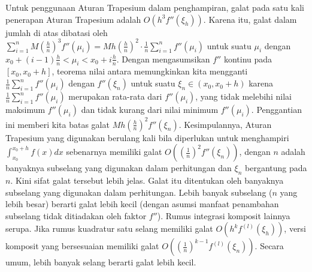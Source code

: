 Untuk penggunaan Aturan Trapesium dalam penghampiran, galat pada satu
kali penerapan Aturan Trapesium adalah $O(h^{3}f''(\xi_{h}))$. Karena
itu, galat dalam jumlah di atas dibatasi oleh $\sum_{i=1}^{n}M\left(\frac{h}{n}\right)^{3}f''(\mu_{i})=Mh\left(\frac{h}{n}\right)^{2}\cdot\frac{1}{n}\sum_{i=1}^{n}f''(\mu_{i})$
untuk suatu $\mu_{i}$ dengan $x_{0}+(i-1)\frac{h}{n}<\mu_{i}<x_{0}+i\frac{h}{n}$.
Dengan mengasumsikan $f''$ kontinu pada $[x_{0},x_{0}+h]$, teorema
nilai antara memungkinkan kita mengganti $\frac{1}{n}\sum_{i=1}^{n}f''(\mu_{i})$
dengan $f''(\xi_{n})$ untuk suatu $\xi_{n}\in(x_{0},x_{0}+h)$ karena
$\frac{1}{n}\sum_{i=1}^{n}f''(\mu_{i})$ merupakan rata-rata dari
$f''(\mu_{i})$, yang tidak melebihi nilai maksimum $f''(\mu_{i})$
dan tidak kurang dari nilai minimum $f''(\mu_{i})$. Penggantian ini
memberi kita batas galat $Mh\left(\frac{h}{n}\right)^{2}f''(\xi_{n})$.
Kesimpulannya, Aturan Trapesium yang digunakan berulang kali bila
diperlukan untuk menghampiri $\int_{x_{0}}^{x_{0}+h}f(x)dx$ sebenarnya
memiliki galat $O\left(\left(\frac{1}{n}\right)^{2}f''(\xi_{n})\right)$,
dengan $n$ adalah banyaknya subselang yang digunakan dalam perhitungan
dan $\xi_{n}$ bergantung pada $n$. Kini sifat galat tersebut lebih
jelas. Galat itu ditentukan oleh banyaknya subselang yang digunakan
dalam perhitungan. Lebih banyak subselang ($n$ yang lebih besar)
berarti galat lebih kecil (dengan asumsi manfaat penambahan subselang
tidak ditiadakan oleh faktor $f''$). Rumus integrasi komposit lainnya
serupa. Jika rumus kuadratur satu selang memiliki galat $O(h^{k}f^{(l)}(\xi_{h}))$,
versi komposit yang bersesuaian memiliki galat $O\left(\left(\frac{1}{n}\right)^{k-1}f^{(l)}(\xi_{n})\right)$.
Secara umum, lebih banyak selang berarti galat lebih kecil. 

